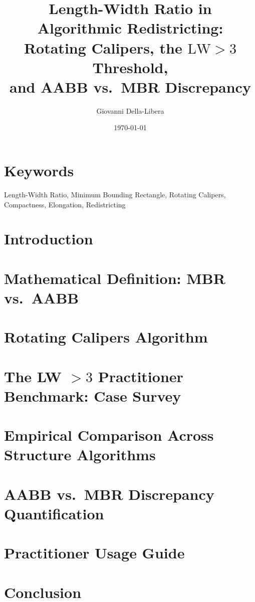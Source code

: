 \documentclass[12pt]{article}
\title{\textbf{Length-Width Ratio in Algorithmic Redistricting:\\
Rotating Calipers, the $\text{LW} > 3$ Threshold,\\
and AABB vs.\ MBR Discrepancy}}
\author{Giovanni Della-Libera}
\date{\today}
\begin{document}
\maketitle

\begin{abstract}

\end{abstract}

\section*{Keywords}
Length-Width Ratio, Minimum Bounding Rectangle, Rotating Calipers,
Compactness, Elongation, Redistricting

\section{Introduction}


\section{Mathematical Definition: MBR vs.\ AABB}


\section{Rotating Calipers Algorithm}


\section{The LW $> 3$ Practitioner Benchmark: Case Survey}


\section{Empirical Comparison Across Structure Algorithms}


\section{AABB vs.\ MBR Discrepancy Quantification}


\section{Practitioner Usage Guide}


\section{Conclusion}




\end{document}

